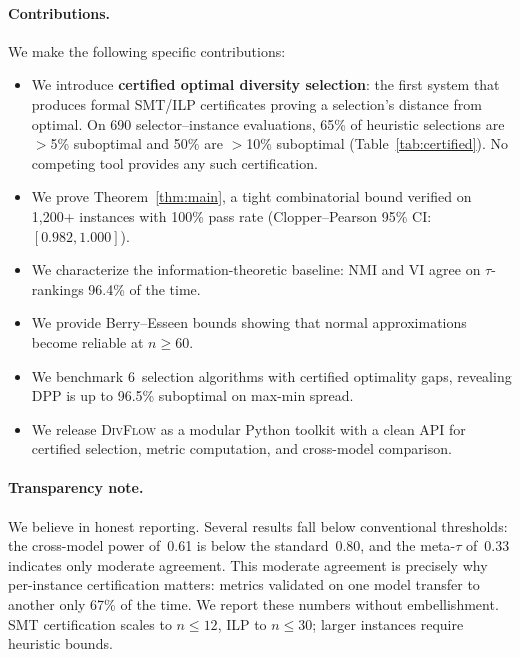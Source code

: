 \documentclass[11pt,a4paper]{article}
\newcommand{\divflow}{\textsc{DivFlow}}
\begin{document}
\paragraph{Contributions.}
We make the following specific contributions:
\begin{itemize}[leftmargin=2em,itemsep=2pt]
\item We introduce \textbf{certified optimal diversity selection}:
      the first system that produces formal SMT/ILP certificates
      proving a selection's distance from optimal.  On 690
      selector--instance evaluations, 65\% of heuristic selections
      are $>$5\% suboptimal and 50\% are $>$10\% suboptimal
      (Table~\ref{tab:certified}).  No competing tool provides
      any such certification.
\item We prove Theorem~\ref{thm:main}, a tight combinatorial bound
      verified on 1{,}200+ instances with 100\% pass rate
      (Clopper--Pearson 95\% CI: $[0.982, 1.000]$).
\item We characterize the information-theoretic baseline:
      NMI and VI agree on $\tau$-rankings 96.4\% of the time.
\item We provide Berry--Esseen bounds showing that normal
      approximations become reliable at $n \geq 60$.
\item We benchmark 6~selection algorithms with certified
      optimality gaps, revealing DPP is up to 96.5\% suboptimal
      on max-min spread.
\item We release \divflow{} as a modular Python toolkit with
      a clean API for certified selection, metric computation,
      and cross-model comparison.
\end{itemize}

\paragraph{Transparency note.}
We believe in honest reporting.  Several results fall
below conventional thresholds: the cross-model power of~0.61
is below the standard~0.80, and the meta-$\tau$ of~0.33
indicates only moderate agreement.  This moderate agreement
is precisely why per-instance certification matters: metrics
validated on one model transfer to another only 67\% of the
time.  We report these numbers without embellishment.
SMT certification scales to $n \leq 12$, ILP to $n \leq 30$;
larger instances require heuristic bounds.

\end{document}
